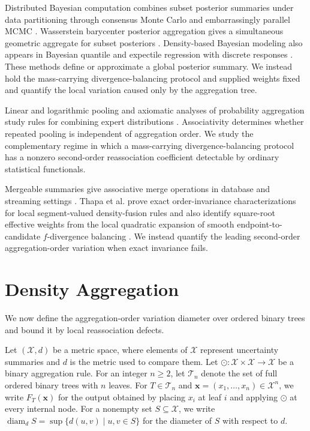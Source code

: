 \documentclass[11pt]{article}
\theoremstyle{plain}
\theoremstyle{definition}
\theoremstyle{definition}
\newcommand{\X}{\mathcal X}
\newcommand{\BT}{\mathcal T}
\newcommand{\op}{\odot}
\newcommand{\diam}{\operatorname{diam}}
\begin{document}
Distributed Bayesian computation combines subset posterior summaries under data partitioning through consensus Monte Carlo and embarrassingly parallel MCMC \cite{neiswanger2014asymptotically,scott2016bayes}. Wasserstein barycenter posterior aggregation gives a simultaneous geometric aggregate for subset posteriors \cite{agueh2011barycenters,srivastava2018scalable}. Density-based Bayesian modeling also appears in Bayesian quantile and expectile regression with discrete responses \cite{liu2021discrete}. These methods define or approximate a global posterior summary. We instead hold the mass-carrying divergence-balancing protocol and supplied weights fixed and quantify the local variation caused only by the aggregation tree.

Linear and logarithmic pooling and axiomatic analyses of probability aggregation study rules for combining expert distributions \cite{stone1961opinion,genest1986combining,jacobs1995methods}. Associativity determines whether repeated pooling is independent of aggregation order. We study the complementary regime in which a mass-carrying divergence-balancing protocol has a nonzero second-order reassociation coefficient detectable by ordinary statistical functionals.

Mergeable summaries give associative merge operations in database and streaming settings \cite{agarwal2013mergeable}. Thapa et al. prove exact order-invariance characterizations for local segment-valued density-fusion rules and also identify square-root effective weights from the local quadratic expansion of smooth endpoint-to-candidate $f$-divergence balancing \cite{thapa2026compositional}. We instead quantify the leading second-order aggregation-order variation when exact invariance fails.

\section{Density Aggregation}\label{sec:aggregation}
We now define the aggregation-order variation diameter over ordered binary trees and bound it by local reassociation defects.

Let $(\X,d)$ be a metric space, where elements of $\X$ represent uncertainty summaries and $d$ is the metric used to compare them. Let $\op:\X\times\X\to\X$ be a binary aggregation rule.  For an integer $n\ge2$, let $\BT_n$ denote the set of full ordered binary trees with $n$ leaves. For $T\in\BT_n$ and $\mathbf{x}=(x_1,\ldots,x_n)\in\X^n$, we write $F_T(\mathbf{x})$ for the output obtained by placing $x_i$ at leaf $i$ and applying $\op$ at every internal node. For a nonempty set $S\subseteq\X$, we write $\diam_{d}S=\sup\{d(u,v) \mid u,v\in S\}$ for the diameter of $S$ with respect to $d$.
\end{document}
